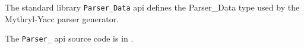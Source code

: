 
The standard library {\tt Parser\_Data} api defines the Parser\_Data type used by the Mythryl-Yacc parser generator.

The {\tt Parser\_} api source code is in .

